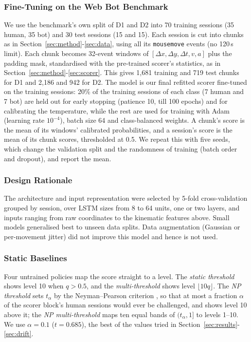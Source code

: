 \documentclass{ieeetj}
\begin{document}
\vspace{-15pt}
\subsubsection{Fine-Tuning on the Web Bot Benchmark}
We use the benchmark's own split of D1 and D2 into 70 training sessions (35 human, 35 bot) and 30 test sessions (15 and 15). Each session is cut into chunks as in Section~\ref{sec:method}-\ref{sec:data}, using all its \texttt{mousemove} events (no 120\,s limit). Each chunk becomes 32-event windows of $[\Delta x,\Delta y,\Delta t,v,a]$ plus the padding mask, standardised with the pre-trained scorer's statistics, as in Section~\ref{sec:method}-\ref{sec:scorer}. This gives 1{,}681 training and 719 test chunks for D1 and 2{,}186 and 942 for D2. The model is our final refitted scorer fine-tuned on the training sessions: 20\% of the training sessions of each class (7 human and 7 bot) are held out for early stopping (patience 10, till 100 epochs) and for calibrating the temperature, while the rest are used for training with Adam (learning rate $10^{-4}$), batch size 64 and class-balanced weights. A chunk's score is the mean of its windows' calibrated probabilities, and a session's score is the mean of its chunk scores, thresholded at 0.5. We repeat this with five seeds, which change the validation split and the randomness of training (batch order and dropout), and report the mean.

\vspace{-15pt}
\subsubsection{Design Rationale}
The architecture and input representation were selected by 5-fold cross-validation grouped by session, over LSTM sizes from 8 to 64 units, one or two layers, and inputs ranging from raw coordinates to the kinematic features above. Small models generalised best to unseen data splits. Data augmentation (Gaussian or per-movement jitter) did not improve this model and hence is not used.

\vspace{-15pt}
\subsubsection{Static Baselines}
Four untrained policies map the score straight to a level. The \emph{static threshold} shows level 10 when $q>0.5$, and the \emph{multi-threshold} shows level $\lfloor10q\rfloor$. The \emph{NP threshold} sets $t_\alpha$ by the Neyman--Pearson criterion \cite{scott_nowak_2005,tong_np_2018}, so that at most a fraction $\alpha$ of the scorer block's human sessions would ever be challenged, and shows level 10 above it; the \emph{NP multi-threshold} maps ten equal bands of $(t_\alpha,1]$ to levels 1--10. We use $\alpha=0.1$ ($t=0.685$), the best of the values tried in Section~\ref{sec:results}-\ref{sec:drift}.
\end{document}

